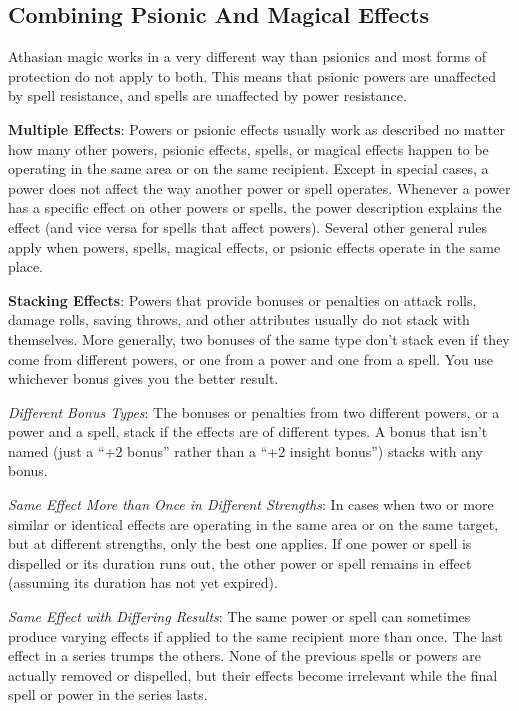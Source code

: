 \subsection{Combining Psionic And Magical Effects}
Athasian magic works in a very different way than psionics and most forms of protection do not apply to both. This means that psionic powers are unaffected by spell resistance, and spells are unaffected by power resistance.

\textbf{Multiple Effects}: Powers or psionic effects usually work as described no matter how many other powers, psionic effects, spells, or magical effects happen to be operating in the same area or on the same recipient. Except in special cases, a power does not affect the way another power or spell operates. Whenever a power has a specific effect on other powers or spells, the power description explains the effect (and vice versa for spells that affect powers). Several other general rules apply when powers, spells, magical effects, or psionic effects operate in the same place.

\textbf{Stacking Effects}: Powers that provide bonuses or penalties on attack rolls, damage rolls, saving throws, and other attributes usually do not stack with themselves. More generally, two bonuses of the same type don't stack even if they come from different powers, or one from a power and one from a spell. You use whichever bonus gives you the better result.

\textit{Different Bonus Types}: The bonuses or penalties from two different powers, or a power and a spell, stack if the effects are of different types. A bonus that isn't named (just a ``+2 bonus'' rather than a ``+2 insight bonus'') stacks with any bonus.

\textit{Same Effect More than Once in Different Strengths}: In cases when two or more similar or identical effects are operating in the same area or on the same target, but at different strengths, only the best one applies. If one power or spell is dispelled or its duration runs out, the other power or spell remains in effect (assuming its duration has not yet expired).

\textit{Same Effect with Differing Results}: The same power or spell can sometimes produce varying effects if applied to the same recipient more than once. The last effect in a series trumps the others. None of the previous spells or powers are actually removed or dispelled, but their effects become irrelevant while the final spell or power in the series lasts.

